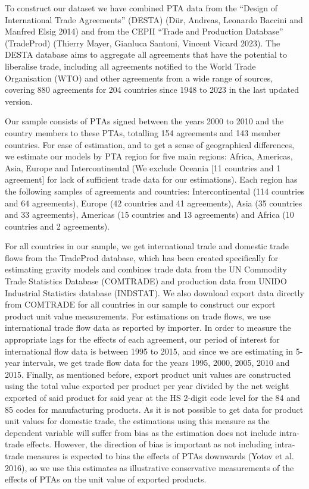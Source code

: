 To construct our dataset we have combined PTA data from the ``Design of
International Trade Agreements'' (DESTA) (Dür, Andreas, Leonardo Baccini
and Manfred Elsig 2014) and from the CEPII ``Trade and Production
Database'' (TradeProd) (Thierry Mayer, Gianluca Santoni, Vincent Vicard
2023). The DESTA database aims to aggregate all agreements that have the
potential to liberalise trade, including all agreements notified to the
World Trade Organisation (WTO) and other agreements from a wide range of
sources, covering 880 agreements for 204 countries since 1948 to 2023 in
the last updated version.

Our sample consists of PTAs signed between the years 2000 to 2010 and
the country members to these PTAs, totalling 154 agreements and 143
member countries. For ease of estimation, and to get a sense of
geographical differences, we estimate our models by PTA region for five
main regions: Africa, Americas, Asia, Europe and Intercontinental (We
exclude Oceania {[}11 countries and 1 agreement{]} for lack of
sufficient trade data for our estimations). Each region has the
following samples of agreements and countries: Intercontinental (114
countries and 64 agreements), Europe (42 countries and 41 agreements),
Asia (35 countries and 33 agreements), Americas (15 countries and 13
agreements) and Africa (10 countries and 2 agreements).

For all countries in our sample, we get international trade and domestic
trade flows from the TradeProd database, which has been created
specifically for estimating gravity models and combines trade data from
the UN Commodity Trade Statistics Database (COMTRADE) and production
data from UNIDO Industrial Statistics database (INDSTAT). We also
download export data directly from COMTRADE for all countries in our
sample to construct our export product unit value measurements. For
estimations on trade flows, we use international trade flow data as
reported by importer. In order to measure the appropriate lags for the
effects of each agreement, our period of interest for international flow
data is between 1995 to 2015, and since we are estimating in 5-year
intervals, we get trade flow data for the years 1995, 2000, 2005, 2010
and 2015. Finally, as mentioned before, export product unit values are
constructed using the total value exported per product per year divided
by the net weight exported of said product for said year at the HS
2-digit code level for the 84 and 85 codes for manufacturing products.
As it is not possible to get data for product unit values for domestic
trade, the estimations using this measure as the dependent variable will
suffer from bias as the estimation does not include intra-trade effects.
However, the direction of bias is important as not including intra-trade
measures is expected to bias the effects of PTAs downwards (Yotov et al.
2016), so we use this estimates as illustrative conservative
measurements of the effects of PTAs on the unit value of exported
products.